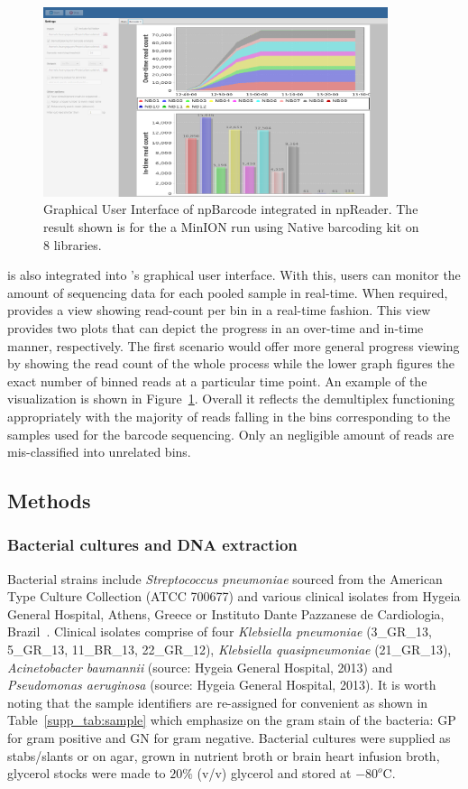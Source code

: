 \begin{figure}[ht]
\centerline{\includegraphics[width=0.9\textwidth]{images/native2.png}}
\caption{Graphical User Interface of npBarcode integrated in npReader. The 
result shown is for the a MinION run using Native barcoding kit on 8 libraries.}
\label{fig:gui_npbarcode}
\end{figure}
\npbarcode{} is also integrated into \npreader{}'s graphical user interface. With 
this, users can monitor the amount of sequencing data for each pooled sample
in real-time. When required, \npreader{} provides a view showing read-count per bin 
in a real-time fashion. This view provides two plots that can depict the progress 
in an over-time and in-time manner, respectively. The first scenario would offer 
more general progress viewing by showing the read count of the whole process 
while the lower graph figures the exact number of binned reads at a particular 
time point. An example of the visualization is shown in Figure~\ref{fig:gui_npbarcode}. 
Overall it reflects the 
demultiplex functioning appropriately with the majority of reads falling in the 
bins corresponding to the samples used for the barcode sequencing. Only an 
negligible  amount of reads are mis-classified into unrelated bins.

\subsection{Methods}
\subsubsection{Bacterial cultures and DNA extraction}
Bacterial strains include \emph{Streptococcus pneumoniae} sourced from the American Type Culture Collection (ATCC 700677) and various clinical isolates from Hygeia General Hospital, Athens, Greece or Instituto Dante Pazzanese de Cardiologia, Brazil~\cite{Miranda2018}. Clinical isolates comprise of four \emph{Klebsiella pneumoniae} (3\_GR\_13, 5\_GR\_13, 11\_BR\_13, 22\_GR\_12), \emph{Klebsiella quasipneumoniae} (21\_GR\_13), \emph{Acinetobacter baumannii} (source: Hygeia General Hospital, 2013) and \emph{Pseudomonas aeruginosa} (source: Hygeia General Hospital, 2013). It is worth noting that the sample identifiers are re-assigned for convenient as shown in Table~\ref{supp_tab:sample} which emphasize on the gram stain of the bacteria: GP for gram positive and GN for gram negative.
Bacterial cultures were supplied as stabs/slants or on agar, grown in nutrient broth or brain heart infusion broth, glycerol stocks were made to $20 \%$ (v/v) glycerol and stored at $−80^o$C.


